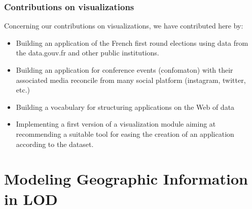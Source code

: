 \documentclass[a4paper,11pt]{report}
\begin{document}
\subsection{Contributions on visualizations}
Concerning our contributions on visualizations, we have contributed here by:
\begin{itemize}
\item Building an application of the French first round elections using data from the data.gouv.fr and other public institutions.
\item Building an application for conference events (confomaton) with their associated media reconcile from many social platform (instagram, twitter, etc.)
\item Building a vocabulary for structuring applications on the Web of data
\item Implementing a first version of a visualization module aiming at recommending a suitable tool for easing the creation of an application according to the dataset.

\end{itemize}


\chapter{Modeling Geographic Information in LOD}
\end{document}
